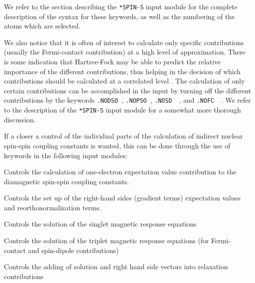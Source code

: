 \smallskip

We refer to the section describing the \verb|*SPIN-S| input module for
the complete description of the syntax for these keywords, as well as
the numbering of the atoms which are selected.

We also notice that it is often of interest to calculate only specific
contributions (usually the Fermi-contact contribution) at a high level
of approximation. There is some indication that Hartree-Fock may be
able to predict the relative importance of the different
contributions, thus helping in the decision of which contributions
should be calculated at a correlated level \cite{krthklbpjcpl226}.
The calculation of only certain contributions can be accomplished in
the input by turning off the different 
contributions by the keywords \verb|.NODSO |, \verb|.NOPSO |,
\verb|.NOSD  |, and \verb|.NOFC  |. We refer to the description of the
\verb|*SPIN-S| input module for a somewhat more thorough discussion.

If a closer a control of the individual parts of the calculation of
indirect nuclear spin-spin coupling constants is wanted, this can be
done through the use of keywords in the following input modules:

\begin{list}{}{\itemsep 0.10cm \parsep 0.0cm}
\item[\verb|*EXPECT|] Controls the calculation of one-electron
expectation value contribution to the diamagnetic spin-spin coupling
constants. 
\item[\verb|*GETSGY|] Controls the set up of the right-hand sides
(gradient terms) 
expectation values and reorthonormalization terms.
\item[\verb|*LINRES|] Controls the solution of the singlet magnetic
response equations
\item[\verb|*TRPRSP|] Controls the solution of the triplet magnetic
response equations (for Fermi-contact and spin-dipole contributions)
\item[\verb|*RELAX |] Controls the adding of solution and right hand
side vectors into relaxation contributions
\end{list}
